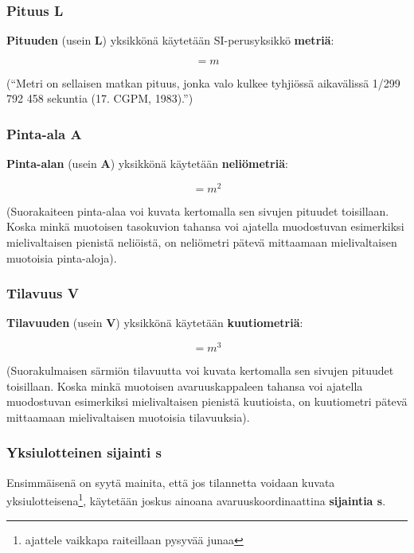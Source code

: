 \documentclass[12pt,a4paper,finnish]{book}
\begin{document}
\subsubsection{Pituus L}

\textbf{Pituuden} (usein \textbf{L}) yksikkönä käytetään SI-perusyksikkö \textbf{metriä}:

\begin{equation}
 [L] = m
\end{equation}

(``Metri on sellaisen matkan pituus, jonka valo kulkee tyhjiössä aikavälissä 1/299 792 458 sekuntia 
(17. CGPM, 1983).'')

\subsubsection{Pinta-ala A}

\textbf{Pinta-alan} (usein \textbf{A}) yksikkönä käytetään \textbf{neliömetriä}:

\begin{equation}
 [A] = m^2
\end{equation}

(Suorakaiteen pinta-alaa voi kuvata kertomalla sen sivujen pituudet toisillaan. Koska minkä muotoisen tasokuvion 
tahansa voi ajatella muodostuvan esimerkiksi mielivaltaisen pienistä neliöistä, on neliömetri pätevä mittaamaan 
mielivaltaisen muotoisia pinta-aloja).

\subsubsection{Tilavuus V}

\textbf{Tilavuuden} (usein \textbf{V}) yksikkönä käytetään \textbf{kuutiometriä}:

\begin{equation}
 [V] = m^3
\end{equation}

(Suorakulmaisen särmiön tilavuutta voi kuvata kertomalla sen sivujen pituudet toisillaan. Koska minkä muotoisen avaruuskappaleen 
tahansa voi ajatella muodostuvan esimerkiksi mielivaltaisen pienistä kuutioista, on kuutiometri pätevä mittaamaan 
mielivaltaisen muotoisia tilavuuksia).

\subsubsection{Yksiulotteinen sijainti s}

Ensimmäisenä on syytä mainita, että jos tilannetta voidaan kuvata yksiulotteisena\footnote{ajattele vaikkapa 
raiteillaan pysyvää junaa}, käytetään joskus ainoana avaruuskoordinaattina \textbf{sijaintia s}.
\end{document}
